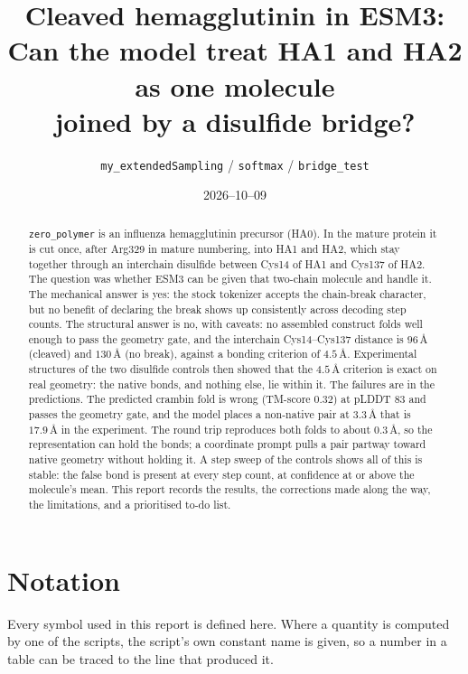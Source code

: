 \documentclass[11pt,a4paper]{article}
\title{Cleaved hemagglutinin in ESM3:\\
       \large Can the model treat HA1 and HA2 as one molecule\\
       joined by a disulfide bridge?}
\author{\texttt{my\_extendedSampling} / \texttt{softmax} / \texttt{bridge\_test}}
\date{2026--10--09}
\newcommand{\ang}{\,\mbox{\AA}}
\begin{document}
\maketitle

\begin{abstract}
\noindent
\texttt{zero\_polymer} is an influenza hemagglutinin precursor (HA0). In the
mature protein it is cut once, after Arg329 in mature numbering, into HA1 and
HA2, which stay together through an interchain disulfide between Cys14 of HA1
and Cys137 of HA2. The question was whether ESM3 can be given that two-chain
molecule and handle it. The mechanical answer is yes: the stock tokenizer
accepts the chain-break character, but no benefit of declaring the break shows
up consistently across decoding step counts. The structural answer is no, with
caveats: no
assembled construct folds well enough to pass the geometry gate, and the
interchain Cys14--Cys137 distance is $96\ang$ (cleaved) and $130\ang$ (no
break), against a bonding criterion of $4.5\ang$. Experimental structures of the two disulfide controls then showed that the
$4.5\ang$ criterion is exact on real geometry: the native bonds, and nothing
else, lie within it. The failures are in the predictions. The predicted
crambin fold is wrong (TM-score $0.32$) at pLDDT $83$ and passes the geometry
gate, and the model places a non-native pair at $3.3\ang$ that is $17.9\ang$ in
the experiment. The round trip reproduces both folds to about $0.3\ang$, so the
representation can hold the bonds; a coordinate prompt pulls a pair partway
toward native geometry without holding it. A step sweep of the controls shows
all of this is stable: the false bond is present at every step count, at
confidence at or above the molecule's mean. This report records the results,
the corrections made along the way, the limitations, and a prioritised to-do
list.
\end{abstract}

\tableofcontents

\section{Notation}
\label{sec:notation}

Every symbol used in this report is defined here. Where a quantity is computed
by one of the scripts, the script's own constant name is given, so a number in
a table can be traced to the line that produced it.
\end{document}
